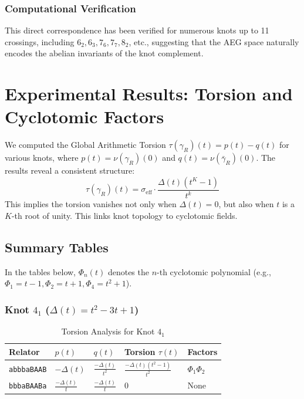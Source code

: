\documentclass[a4paper,12pt]{article}
\begin{document}
\subsubsection{Computational Verification}
This direct correspondence has been verified for numerous knots up to 11 crossings, including $6_2, 6_3, 7_6, 7_7, 8_2$, etc., suggesting that the AEG space naturally encodes the abelian invariants of the knot complement.

\section{Experimental Results: Torsion and Cyclotomic Factors}

We computed the Global Arithmetic Torsion $\tau(\gamma_R)(t) = p(t) - q(t)$ for various knots, where $p(t) = \nu(\gamma_R)(0)$ and $q(t) = \nu(\bar{\gamma}_R)(0)$.
The results reveal a consistent structure:
\begin{equation} \label{eq:torsion_factored_form}
\tau(\gamma_R)(t) = \sigma_{\text{eff}} \cdot \frac{\Delta(t)(t^K-1)}{t^k}
\end{equation}
This implies the torsion vanishes not only when $\Delta(t)=0$, but also when $t$ is a $K$-th root of unity. This links knot topology to cyclotomic fields.

\subsection{Summary Tables}

In the tables below, $\Phi_n(t)$ denotes the $n$-th cyclotomic polynomial (e.g., $\Phi_1 = t-1, \Phi_2 = t+1, \Phi_4 = t^2+1$).

\subsubsection{Knot $4_1$ ($\Delta(t) = t^2 - 3t + 1$)}
\begin{table}[htbp]
\centering
\caption{Torsion Analysis for Knot $4_1$}
\small
\begin{tabular}{p{3.5cm} p{1.8cm} p{1.8cm} p{3.5cm} p{3cm}}
\toprule
\textbf{Relator} & \textbf{$p(t)$} & \textbf{$q(t)$} & \textbf{Torsion $\tau(t)$} & \textbf{Factors} \\
\midrule
\texttt{abbbaBAAB} & $-\Delta(t)$ & $\frac{-\Delta(t)}{t^2}$ & $\frac{-\Delta(t)(t^2-1)}{t^2}$ & $\Phi_1 \Phi_2$ \\
\texttt{bbbaBAABa} & $\frac{-\Delta(t)}{t}$ & $\frac{-\Delta(t)}{t}$ & $0$ & None \\
\bottomrule
\end{tabular}
\end{table}
\end{document}
